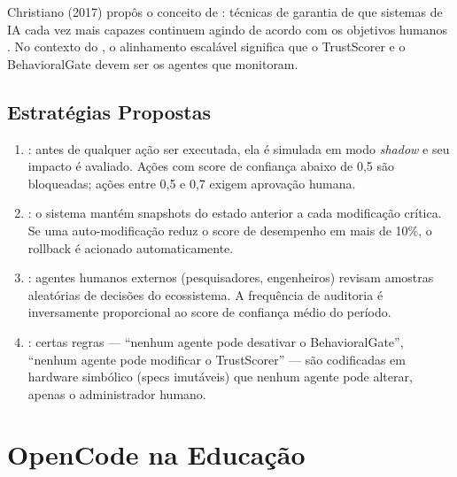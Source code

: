 Christiano (2017) propôs o conceito de : técnicas de garantia de que sistemas de IA cada vez
mais capazes continuem agindo de acordo com os objetivos humanos
\cite{christiano2017alignment}. No contexto do \opencodeeco{}, o
alinhamento escalável significa que o TrustScorer e o
BehavioralGate devem ser 
os agentes que monitoram.

\subsection{Estratégias Propostas}

\begin{enumerate}
    \item {}: antes de qualquer
    ação ser executada, ela é simulada em modo \textit{shadow} e
    seu impacto é avaliado. Ações com score de confiança abaixo de
    0,5 são bloqueadas; ações entre 0,5 e 0,7 exigem aprovação
    humana.

    \item {}: o sistema mantém snapshots
    do estado anterior a cada modificação crítica. Se uma
    auto-modificação reduz o score de desempenho em mais de 10\%,
    o rollback é acionado automaticamente.

    \item {}: agentes humanos
    externos (pesquisadores, engenheiros) revisam amostras
    aleatórias de decisões do ecossistema. A frequência de
    auditoria é inversamente proporcional ao score de confiança
    médio do período.

    \item {}: certas regras
    --- ``nenhum agente pode desativar o BehavioralGate'', ``nenhum
    agente pode modificar o TrustScorer'' --- são codificadas em
    hardware simbólico (specs imutáveis) que nenhum agente pode
    alterar, apenas o administrador humano.
\end{enumerate}

\section{OpenCode na Educação}
\label{sec:educacao}
\nivelbasico

